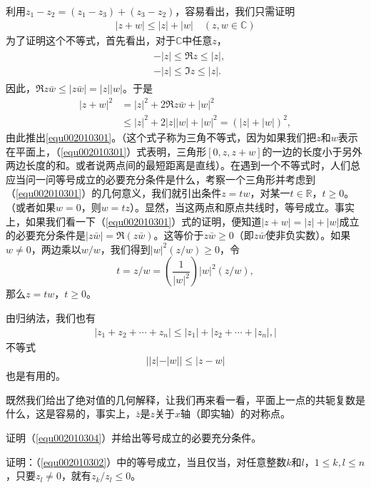 利用$z_1-z_2 = (z_1-z_3) + (z_3-z_2)$，容易看出，我们只需证明
\begin{gather}\label{equ002010301}
|z+w| \le |z| + |w| \quad (z, w \in \mathbb{C})
\end{gather}
为了证明这个不等式，首先看出，对于$\mathbb{C}$中任意$z$，
\begin{gather}\label{equ002010302}
\begin{aligned}
&-|z| \le \Re{z} \le |z|, \\
&-|z| \le \Im{z} \le |z|.
\end{aligned}
\end{gather}
因此，$\Re{z\bar{w}} \le |z\bar{w}| = |z||w|$。于是
\[
\begin{aligned}
|z+w|^2 &= |z|^2 + 2\Re{z\bar{w}} + |w|^2\\
&\le |z|^2 + 2|z||w| + |w|^2 = (|z|+|w|)^2,
\end{aligned}
\]
由此推出\ref{equ002010301}。（这个式子称为三角不等式，因为如果我们把$z$和$w$表示在平面上，（\ref{equ002010301}）式表明，三角形$[0,z,z+w]$的一边的长度小于另外两边长度的和。或者说两点间的最短距离是直线）。在遇到一个不等式时，人们总应当问一问等号成立的必要充分条件是什么，考察一个三角形并考虑到（\ref{equ002010301}）的几何意义，我们就引出条件$z=tw$，对某一$t \in \mathbb{R}$，$t \ge 0$。（或者如果$w=0$，则$w=tz$）。显然，当这两点和原点共线时，等号成立。事实上，如果我们看一下（\ref{equ002010301}）式的证明，便知道$|z+w|=|z|+|w|$成立的必要充分条件是$|z\bar{w}|=\Re(z\bar{w})$。这等价于$z\bar{w}\ge 0$（即$z\bar{w}$使非负实数）。如果$w \neq 0$，两边乘以$w/w$，我们得到$|w|^2(z/w) \ge 0$，令
\[
t = z/w = (\frac{1}{|w|^2})|w|^2(z/w),
\]
那么$z=tw$，$t \ge 0$。

由归纳法，我们也有
\begin{gather}\label{equ002010303}
|z_1+z_2+\cdots+z_n| \le |z_1|+|z_2+\cdots+|z_n|,|
\end{gather}
不等式
\begin{gather}\label{equ002010304}
||z| - |w|| \le |z-w|
\end{gather}
也是有用的。

既然我们给出了绝对值的几何解释，让我们再来看一看，平面上一点的共轭复数是什么，这是容易的，事实上，$\bar{z}$是$z$关于$x$轴（即实轴）的对称点。

\begin{exercise}
证明（\ref{equ002010304}）并给出等号成立的必要充分条件。
\end{exercise}

\begin{exercise}
证明：（\ref{equ002010302}）中的等号成立，当且仅当，对任意整数$k$和$l$，$1 \le k,l \le n$，只要$z_l \neq 0$，就有$z_k/z_l \le 0$。
\end{exercise}

